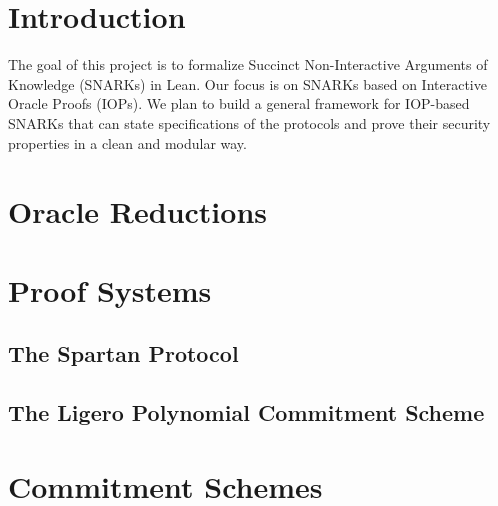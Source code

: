 %

\chapter{Introduction}

The goal of this project is to formalize Succinct Non-Interactive Arguments of Knowledge (SNARKs) in Lean. Our focus is on SNARKs based on Interactive Oracle Proofs (IOPs). We plan to build a general framework for IOP-based SNARKs that can state specifications of the protocols and prove their security properties in a clean and modular way.

\chapter{Oracle Reductions}\label{chap:oracle_reductions}





\chapter{Proof Systems}\label{chap:proof_systems}



\section{The Spartan Protocol}

\section{The Ligero Polynomial Commitment Scheme}

\chapter{Commitment Schemes}\label{chap:commitment_schemes}

